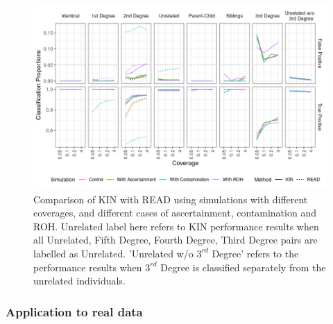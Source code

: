 \documentclass[12pt, letterpaper]{article}
\begin{document}
\begin{figure}[h!]
    \includegraphics[width=16cm]{plots/plotimg/comparison_plot.png}
    \centering
    \caption{Comparison of KIN with READ using simulations with different coverages, and different cases of ascertainment, contamination and ROH. Unrelated label here refers to KIN performance results when all Unrelated, Fifth Degree, Fourth Degree, Third Degree pairs are labelled as Unrelated. 'Unrelated w/o $3^{rd}$ Degree' refers to the performance results when $3^{rd}$ Degree is classified separately from the unrelated individuals.}
    \label{fig3:Comparison_READ_KIN}
\end{figure}


\subsubsection{Application to real data}
\end{document}
